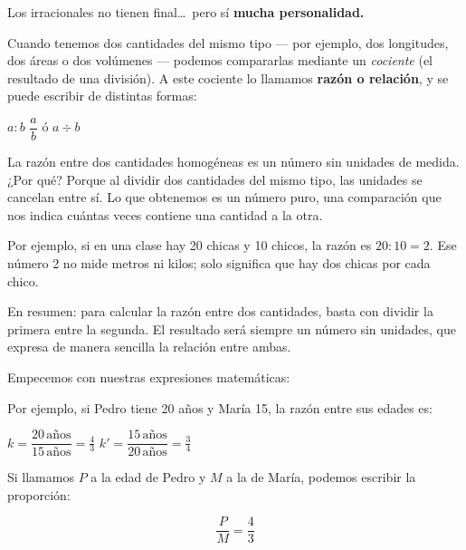 \begin{capitulobox}
Los irracionales no tienen final\ldots\ pero sí \textbf{mucha personalidad.}
\end{capitulobox}



Cuando tenemos dos cantidades del mismo tipo --- por ejemplo, dos longitudes, 
dos áreas o dos volúmenes — podemos compararlas mediante un \textit{cociente}
(el resultado de una división).
A este cociente lo llamamos \textbf{razón o relación}, y se puede escribir de distintas formas:

\begin{center}
$a : b$ \qquad $\dfrac{a}{b}$ \qquad ó \qquad $a \div b$
\end{center}

La razón entre dos cantidades homogéneas es un número sin unidades de medida.
¿Por qué? Porque al dividir dos cantidades del mismo tipo, las unidades se cancelan entre sí.
Lo que obtenemos es un número puro, una comparación que nos indica cuántas
veces contiene una cantidad a la otra.

Por ejemplo, si en una clase hay 20 chicas y 10 chicos, la razón es $20:10 = 2$.
Ese número 2 no mide metros ni kilos; solo significa que hay dos chicas por cada chico.

En resumen: para calcular la razón entre dos cantidades, basta con dividir la primera entre la segunda.
El resultado será siempre un número sin unidades, que expresa de manera sencilla la relación entre ambas.

Empecemos con nuestras expresiones matemáticas:

Por ejemplo, si Pedro tiene 20 años y María 15, la razón entre sus edades
es:

\noindent {}

\begin{ejemplosplain}
  \task $k  = \dfrac{20\,\text{años}}{15\,\text{años}} = \tfrac{4}{3}$
  \task $k' = \dfrac{15\,\text{años}}{20\,\text{años}} = \tfrac{3}{4}$
\end{ejemplosplain}


Si llamamos $P$ a la edad de Pedro y $M$ a la de María, podemos escribir la
proporción:

\[
\dfrac{P}{M} = \dfrac{4}{3} 
\]

